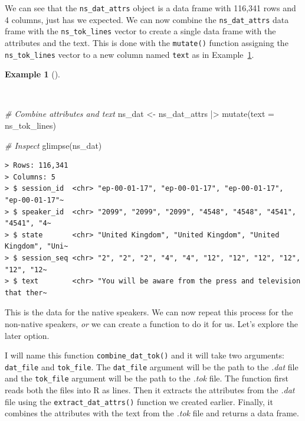 \documentclass[
  letterpaper,
]{latex/krantz}
\newenvironment{Shaded}{\begin{snugshade}}{\end{snugshade}}
\newcommand{\AttributeTok}[1]{\textcolor[rgb]{0.00,0.00,0.00}{#1}}
\newcommand{\CommentTok}[1]{\textcolor[rgb]{0.00,0.00,0.00}{\textit{#1}}}
\newcommand{\FunctionTok}[1]{\textcolor[rgb]{0.00,0.00,0.00}{#1}}
\newcommand{\NormalTok}[1]{\textcolor[rgb]{0.00,0.00,0.00}{#1}}
\newcommand{\OtherTok}[1]{\textcolor[rgb]{0.00,0.00,0.00}{#1}}
\newcommand{\SpecialCharTok}[1]{\textcolor[rgb]{0.00,0.00,0.00}{#1}}
\theoremstyle{definition}
\newtheorem{example}{Example}[chapter]
\theoremstyle{remark}
\begin{document}
We can see that the \texttt{ns\_dat\_attrs} object is a data frame with
116,341 rows and 4 columns, just has we expected. We can now combine the
\texttt{ns\_dat\_attrs} data frame with the \texttt{ns\_tok\_lines}
vector to create a single data frame with the attributes and the text.
This is done with the \texttt{mutate()} function assigning the
\texttt{ns\_tok\_lines} vector to a new column named \texttt{text} as in
Example~\ref{exm-cd-enntt-combine-attributes-text}.

\begin{example}[]\protect\hypertarget{exm-cd-enntt-combine-attributes-text}{}\label{exm-cd-enntt-combine-attributes-text}

~

\begin{Shaded}
\begin{Highlighting}[]
\CommentTok{\# Combine attributes and text}
\NormalTok{ns\_dat }\OtherTok{\textless{}{-}}
\NormalTok{  ns\_dat\_attrs }\SpecialCharTok{|\textgreater{}}
  \FunctionTok{mutate}\NormalTok{(}\AttributeTok{text =}\NormalTok{ ns\_tok\_lines)}

\CommentTok{\# Inspect}
\FunctionTok{glimpse}\NormalTok{(ns\_dat)}
\end{Highlighting}
\end{Shaded}

\begin{verbatim}
> Rows: 116,341
> Columns: 5
> $ session_id  <chr> "ep-00-01-17", "ep-00-01-17", "ep-00-01-17", "ep-00-01-17"~
> $ speaker_id  <chr> "2099", "2099", "2099", "4548", "4548", "4541", "4541", "4~
> $ state       <chr> "United Kingdom", "United Kingdom", "United Kingdom", "Uni~
> $ session_seq <chr> "2", "2", "2", "4", "4", "12", "12", "12", "12", "12", "12~
> $ text        <chr> "You will be aware from the press and television that ther~
\end{verbatim}

\end{example}

This is the data for the native speakers. We can now repeat this process
for the non-native speakers, \emph{or} we can create a function to do it
for us. Let's explore the later option.

I will name this function \texttt{combine\_dat\_tok()} and it will take
two arguments: \texttt{dat\_file} and \texttt{tok\_file}. The
\texttt{dat\_file} argument will be the path to the \emph{.dat} file and
the \texttt{tok\_file} argument will be the path to the \emph{.tok}
file. The function first reads both the files into R as lines. Then it
extracts the attributes from the \emph{.dat} file using the
\texttt{extract\_dat\_attrs()} function we created earlier. Finally, it
combines the attributes with the text from the \emph{.tok} file and
returns a data frame.
\end{document}
